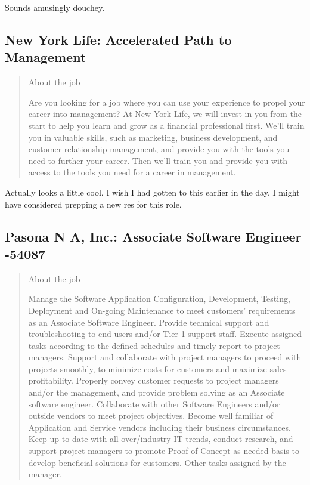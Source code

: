 \documentclass[
	letterpaper, %
	12pt, %
]{CSSullivanBusinessReport}
\begin{document}
Sounds amusingly douchey.


\subsection[New York Life]{New York Life: Accelerated Path to Management}

\begin{quote}
	About the job
	
	Are you looking for a job where you can use your experience to propel your career into management? At New York Life, we will invest in you from the start to help you learn and grow as a financial professional first. We’ll train you in valuable skills, such as marketing, business development, and customer relationship management, and provide you with the tools you need to further your career. Then we’ll train you and provide you with access to the tools you need for a career in management.

\end{quote}

Actually looks a little cool. I wish I had gotten to this earlier in the day, I might have considered prepping a new res for this role. 


\subsection[Pasona N A, Inc.]{Pasona N A, Inc.: Associate Software Engineer -54087}

\begin{quote}
	About the job
	
    Manage the Software Application Configuration, Development, Testing, Deployment and On-going Maintenance to meet customers’ requirements as an Associate Software Engineer.
    Provide technical support and troubleshooting to end-users and/or Tier-1 support staff.
    Execute assigned tasks according to the defined schedules and timely report to project managers.
    Support and collaborate with project managers to proceed with projects smoothly, to minimize costs for customers and maximize sales profitability.
    Properly convey customer requests to project managers and/or the management, and provide problem solving as an Associate software engineer.
    Collaborate with other Software Engineers and/or outside vendors to meet project objectives.
    Become well familiar of Application and Service vendors including their business circumstances.
    Keep up to date with all-over/industry IT trends, conduct research, and support project managers to promote Proof of Concept as needed basis to develop beneficial solutions for customers.
    Other tasks assigned by the manager.


\end{quote}
\end{document}
